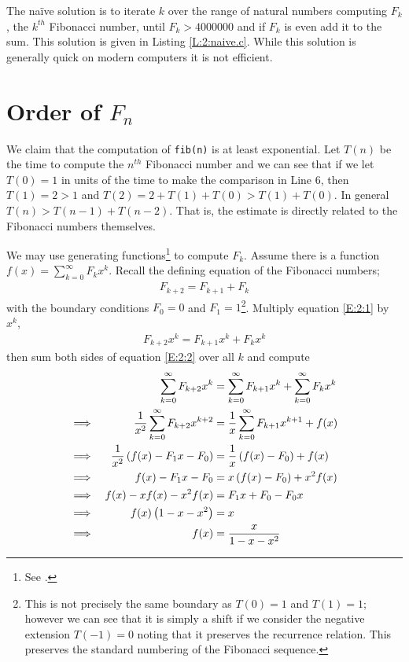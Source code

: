 \documentclass[oneside,12pt]{book}   	%
\newcounter{ex}
\newcounter{def}
\newcounter{pr}
\theoremstyle{definition}
\begin{document}
\begin{spacing}{1.618}
			The na\"ive solution is to iterate $k$ over the range of natural numbers computing $F_k$, the $k^{th}$ Fibonacci number, until $F_k>4000000$ and if $F_k$ is even add it to the sum. This solution is given in Listing \ref{L:2:naive.c}. While this solution is generally quick on modern computers it is not efficient. 
			
			
		\section{Order of $F_n$}
			We claim that the computation of \texttt{fib(n)} is at least exponential. Let $T(n)$ be the time to compute the $n^{th}$ Fibonacci number and we can see that if we let $T(0)=1$ in units of the time to make the comparison in Line 6, then $T(1)=2 > 1$ and $T(2)=2+T(1)+T(0)> T(1)+T(0)$. In general $T(n)> T(n-1)+T(n-2)$. That is, the estimate is directly related to the Fibonacci numbers themselves.
			
			We may use generating functions\footnote{See \cite{Wilf2006,GKP94}.} to compute $F_k$. Assume there is a function $f(x)=\sum_{k=0}^\infty F_kx^k$. Recall the defining equation of the Fibonacci numbers;
			\begin{alignat}{4}
				F_{k+2}=F_{k+1}+F_k \label{E:2:1}
			\end{alignat}
			with the boundary conditions $F_0=0$ and $F_1=1$\footnote{This is not precisely the same boundary as $T(0)=1$ and $T(1)=1$; however we can see that it is simply a shift if we consider the negative extension $T(-1)=0$ noting that it preserves the recurrence relation. This preserves the standard numbering of the Fibonacci sequence.}. Multiply equation \ref{E:2:1} by $x^k$,
			\begin{alignat}{4}
				F_{k+2}x^k=F_{k+1}x^k+F_kx^k \label{E:2:2}
			\end{alignat}
			then sum both sides of equation \ref{E:2:2} over all $k$ and compute
			\begin{alignat}{4}
					&&\sum_{k=0}^\infty F_{k+2}x^k&=\sum_{k=0}^\infty F_{k+1}x^k +\sum_{k=0}^\infty F_kx^k \notag \\
				\implies &&\frac{1}{x^2}\sum_{k=0}^\infty F_{k+2}x^{k+2}&=\frac{1}{x}\sum_{k=0}^\infty F_{k+1}x^{k+1} +f(x) \notag \\
				\implies && \frac{1}{x^2}\left(f(x)-F_1x-F_0\right)&=\frac{1}{x}\left(f(x)-F_0\right) + f(x) \notag \\
				\implies && f(x)-F_1x-F_0&=x\left(f(x)-F_0\right)+x^2f(x) \notag \\
				\implies && f(x)-xf(x)-x^2f(x)&=F_1x+F_0-F_0x \notag \\
				\implies && f(x)\left(1-x-x^2\right)&=x \notag \\
				\implies && f(x)&=\frac{x}{1-x-x^2} \label{E:2:3}
			\end{alignat}
			

\end{spacing}
\end{document}
